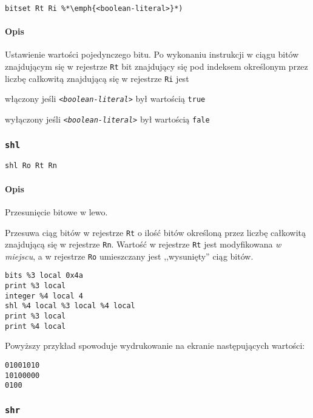 \begin{lstlisting}
bitset Rt Ri %*\emph{<boolean-literal>}*)
\end{lstlisting}

\paragraph*{Opis} Ustawienie wartości pojedynczego bitu.
Po wykonaniu instrukcji w ciągu bitów znajdującym się w rejestrze \texttt{Rt}
bit znajdujący się pod indeksem określonym przez liczbę całkowitą znajdującą
się w rejestrze \texttt{Ri} jest
\begin{enumerate*}[label=(\arabic*)]
\item włączony jeśli \texttt{\emph{<boolean-literal>}} był wartością
    \texttt{true}
\item wyłączony jeśli \texttt{\emph{<boolean-literal>}} był wartością
    \texttt{fale}
\end{enumerate*}

\subsubsection{\texttt{shl}}

\begin{lstlisting}
shl Ro Rt Rn
\end{lstlisting}

\paragraph*{Opis} Przesunięcie bitowe w lewo.

Przesuwa ciąg bitów w rejestrze \texttt{Rt} o ilość bitów określoną przez liczbę
całkowitą znajdującą się w rejestrze \texttt{Rn}. Wartość w rejestrze
\texttt{Rt} jest modyfikowana \emph{w miejscu}, a w rejestrze \texttt{Ro}
umieszczany jest ,,wysunięty'' ciąg bitów.
\begin{lstlisting}
bits %3 local 0x4a
print %3 local
integer %4 local 4
shl %4 local %3 local %4 local
print %3 local
print %4 local
\end{lstlisting}

Powyższy przykład spowoduje wydrukowanie na ekranie następujących wartości:
\begin{lstlisting}
01001010
10100000
0100
\end{lstlisting}

\subsubsection{\texttt{shr}}

